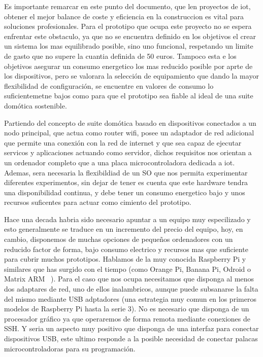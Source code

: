 Es importante remarcar en este punto del documento, que len proyectos de \gls{iot}, obtener el mejor balance de coste y eficiencia en la construccion es vital para soluciones profesionales. Para el prototipo que ocupa este proyecto no se espera enfrentar este obstaculo, ya que no se encuentra definido en los objetivos el crear un sistema los mas equilibrado posible, sino uno funcional, respetando un limite de gasto que no supere la cuantia definida de 50 euros. Tampoco esta e los objetivos asegurar un consumo energetico los mas reducido posible por aprte de los dispositivos, pero se valorara la selección de equipamiento que dando la mayor flexibilidad de configuración, se encuentre en valores de consumo lo suficientemetne bajos como para que el prototipo sea fiable al ideal de una suite domótica sostenible.

Partiendo del concepto de suite domótica basado en dispositivos conectados a un nodo principal, que actua como router wifi, posee un adaptador de red adicional que permite una conexión con la red de internet y que sea capaz de ejecutar servicos y aplicaciones actuando como servidor, dichos requisitos nos orientan a un ordenador completo que a una placa microcontroladora dedicada a \gls{iot}. Ademas, sera necesaria la flexibildiad de un SO que nos permita experimentar diferentes experimentos, sin dejar de tener es cuenta que este hardware tendra una disponibilidad continua, y debe tener un consumo energetico bajo y unos recursos suficentes para actuar como cimiento del prototipo.

Hace una decada habria sido necesario apuntar a un equipo muy especilizado y esto generalmente se traduce en un incremento del precio del equipo, hoy, en cambio, disponemos de muchas opciones de pequeños ordenadores con un reducido factor de forma, bajo consumo electrico y recursos mas que suficiente para cubrir muchos prototipos. Hablamos de la muy conocida Raspberry Pi y similares que has surgido con el tiempo (como Orange Pi, Banana Pi, Odroid o Matrix ARM ~\cite{lignuxComparative}). Para el caso que nos ocupa necesitamos que disponga al menos dos adaptares de red, uno de ellos inalambricos, aunque puede subsanarse la falta del mismo mediante USB adptadores (una estrategia muy comun en los primeros modelos de Raspberry Pi hasta la serie 3). No es necesario que disponga de un procesador gráfico ya que operaremos de forma remota mediante conexiones de SSH. Y seria un aspecto muy positivo que disponga de una interfaz para conectar dispositivos USB, este ultimo responde a la posible necesidad de conectar palacas microcontroladoras para su programación.


